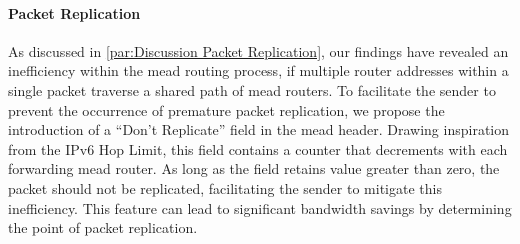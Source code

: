 \paragraph{Packet Replication} %
\label{par:Proposal Packet Replication}
As discussed in \autoref{par:Discussion Packet Replication}, our findings have
    revealed an inefficiency within the \gls{mead} routing process, if multiple
    router addresses within a single packet traverse a shared path of \gls{mead}
    routers.
To facilitate the sender to prevent the occurrence of premature packet
    replication, we propose the introduction of a ``Don't Replicate'' field in
    the \gls{mead} header.
Drawing inspiration from the IPv6 Hop Limit, this field contains a counter that
    decrements with each forwarding \gls{mead} router.
As long as the field retains value greater than zero, the packet should not be
    replicated, facilitating the sender to mitigate this inefficiency.
This feature can lead to significant bandwidth savings by determining the point
    of packet replication.




